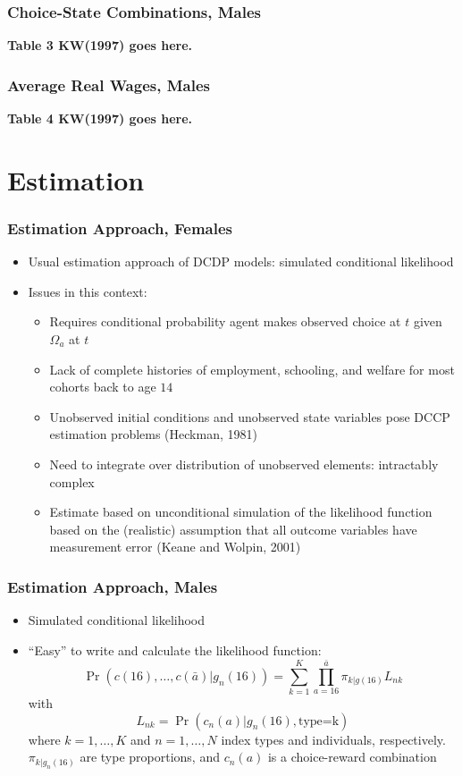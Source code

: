 \begin{frame}
	\frametitle{Choice-State Combinations, Males}
	\textbf{Table 3 KW(1997) goes here.}
\end{frame}

\begin{frame}
	\frametitle{Average Real Wages, Males}
	\textbf{Table 4 KW(1997) goes here.}
\end{frame}


\section{Estimation}

\begin{frame}
	\frametitle{Estimation Approach, Females}
		\begin{itemize}
			\item Usual estimation approach of DCDP models: simulated conditional likelihood
			\item Issues in this context:
				\begin{itemize}
					\item Requires conditional probability agent makes observed choice at $t$ given $\Omega_{a}$ at $t$
					\item Lack of complete histories of employment, schooling, and welfare for most cohorts back to age $14$
					\item Unobserved initial conditions and unobserved state variables pose DCCP estimation problems (Heckman, 1981)
					\item Need to integrate over distribution of unobserved elements: intractably complex
					\item Estimate based on unconditional simulation of the likelihood function based on the (realistic) assumption that all outcome variables have measurement error (Keane and Wolpin, 2001)
				\end{itemize}							
		\end{itemize}
\end{frame}

\begin{frame}
	\frametitle{Estimation Approach, Males}
		\begin{itemize}
			\item Simulated conditional likelihood
			\item ``Easy'' to write and calculate the likelihood function:
			\begin{equation}
				\Pr \left( c(16), \ldots, c(\bar{a})|g_{n}(16) \right) =
\sum \limits _{k=1} ^K \prod \limits _{a=16} ^{\bar{a}} \pi_{k|g(16)} L_{nk} \nonumber
			\end{equation}
\noindent with
\begin{equation}
L_{nk} = \Pr \left( c_{n}(a) | g_n(16), \text{type=k} \right)	\nonumber 
\end{equation}
\noindent where $k=1,\ldots,K$ and $n = 1, \ldots, N$ index types and individuals, respectively. $\pi_{k|g_{n}(16)}$ are type proportions, and $c_{n}(a)$ is a choice-reward combination
		\end{itemize}
\end{frame}

